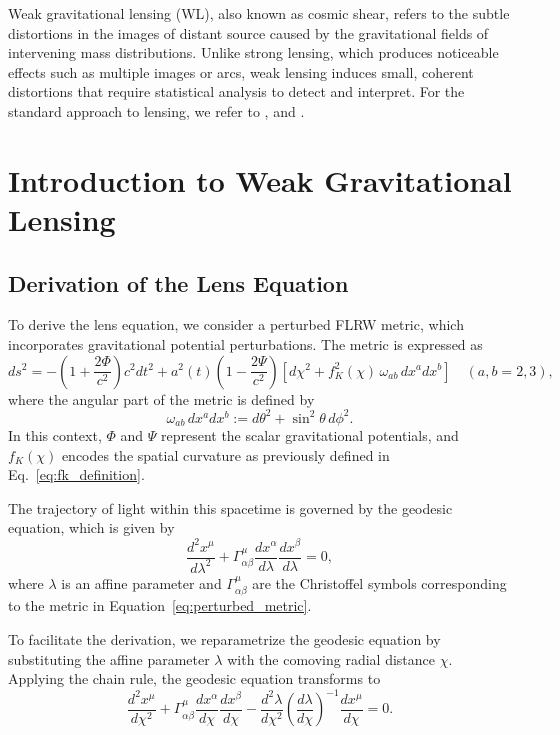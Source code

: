Weak gravitational lensing (WL), also known as cosmic shear, refers to the subtle distortions in the images of distant source caused by the gravitational fields of intervening mass distributions. Unlike strong lensing, which produces noticeable effects such as multiple images or arcs, weak lensing induces small, coherent distortions that require statistical analysis to detect and interpret. For the standard approach to lensing, we refer to \citet{1992grle.book.....S}, \citet{2001PhR...340..291B} and \citet{2010CQGra..27w3001B}.

\section{Introduction to Weak Gravitational Lensing}
\subsection{Derivation of the Lens Equation }
To derive the lens equation, we consider a perturbed FLRW metric, which incorporates gravitational potential perturbations. The metric is expressed as
\begin{equation}
    ds^2 = -\left(1 + \frac{2\Phi}{c^2}\right)c^2 dt^2 + a^2(t) \left(1 - \frac{2\Psi}{c^2}\right) \left[ d\chi^2 + f_K^2(\chi) \, \omega_{ab} \, dx^a dx^b \right] \quad (a, b = 2, 3),
    \label{eq:perturbed_metric}
\end{equation}
where the angular part of the metric is defined by
\begin{equation}
    \omega_{ab} \, dx^a dx^b := d\theta^2 + \sin^2 \theta \, d\phi^2.
    \label{eq:angular_metric}
\end{equation}
In this context, \( \Phi \) and \( \Psi \) represent the scalar gravitational potentials, and \( f_K(\chi) \) encodes the spatial curvature as previously defined in Eq.~\eqref{eq:fk_definition}.

The trajectory of light within this spacetime is governed by the geodesic equation, which is given by
\begin{equation}
    \frac{d^2 x^\mu}{d\lambda^2} + \Gamma^\mu_{\alpha \beta} \frac{dx^\alpha}{d\lambda} \frac{dx^\beta}{d\lambda} = 0,
    \label{eq:geodesic_equation}
\end{equation}
where \( \lambda \) is an affine parameter and \( \Gamma^\mu_{\alpha \beta} \) are the Christoffel symbols corresponding to the metric in Equation~\eqref{eq:perturbed_metric}.

To facilitate the derivation, we reparametrize the geodesic equation by substituting the affine parameter \( \lambda \) with the comoving radial distance \( \chi \). Applying the chain rule, the geodesic equation transforms to
\begin{equation}
    \frac{d^2 x^\mu}{d\chi^2} + \Gamma^\mu_{\alpha \beta} \frac{dx^\alpha}{d\chi} \frac{dx^\beta}{d\chi} - \frac{d^2 \lambda}{d\chi^2} \left( \frac{d\lambda}{d\chi} \right)^{-1} \frac{dx^\mu}{d\chi} = 0.
    \label{eq:geodesic_reparametrized}
\end{equation}


